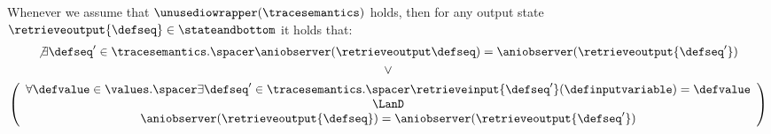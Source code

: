 Whenever we assume that $\unusediowrapper(\tracesemantics)$ holds, then for any output state $\retrieveoutput{\defseq}\in\stateandbottom$ it holds that:
\begin{gather*}
    \not\exists
      \defseq'\in\tracesemantics.\spacer
      \aniobserver(\retrieveoutput\defseq) = \aniobserver(\retrieveoutput{\defseq'}) \\
    \lor \\
    \left(
      \begin{array}{c}
        \forall \defvalue\in\values .\spacer \exists \defseq'\in\tracesemantics .\spacer
        \retrieveinput{\defseq'}(\definputvariable) = \defvalue \\
        \LanD\\
        \aniobserver(\retrieveoutput{\defseq}) = \aniobserver(\retrieveoutput{\defseq'})
      \end{array}
    \right)
\end{gather*}
